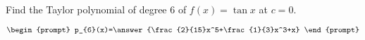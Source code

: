 \documentclass{ximera}
\author{Gregory Hartman \and Matthew Carr}
\begin{document}
\begin{exercise}




Find the Taylor polynomial of degree $6$ of $f(x)=\tan x$ at $c=0$.

\[
\begin{prompt}
p_{6}(x)=\answer{\frac{2}{15}x^5+\frac{1}{3}x^3+x}
\end{prompt}
\]

\end{exercise}
\end{document}
